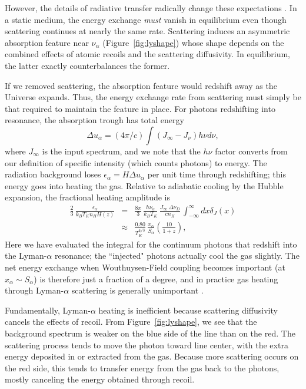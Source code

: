 \documentclass[a4paper,openany, 12pt]{book}
\begin{document}
However, the details of radiative transfer radically change these expectations \cite{chen04}.  In a static medium, the energy exchange \emph{must} vanish in equilibrium even though scattering continues at nearly the same rate.
Scattering induces an asymmetric absorption feature near $\nu_\alpha$ (Figure~\ref{fig:lyshape}) whose shape depends on the combined effects of atomic recoils and the scattering diffusivity.  In equilibrium, the latter exactly counterbalances the former.  

If we removed scattering, the absorption feature would redshift away as the Universe expands. Thus, the energy exchange rate from scattering must simply be that required to maintain the feature in place.  For photons redshifting into resonance, the absorption trough has total energy 
\begin{equation}
\Delta u_\alpha = (4\pi/c) \int (J_\infty - J_\nu) h \nu d \nu,
\end{equation}
where $J_\infty$ is the input spectrum, and we note that the $h \nu$ factor converts from our definition of specific intensity (which counts photons) to energy.  The radiation background loses $\epsilon_\alpha = H \Delta u_\alpha$ per
unit time through redshifting; this energy goes into heating the gas.
Relative to adiabatic cooling by the Hubble expansion, the fractional
heating amplitude is
\begin{eqnarray}
\frac{2}{3} \, \frac{\epsilon_\alpha}{k_B T_K n_H H(z) } & = & \frac{8 \pi}{3} \, \frac{h \nu_\alpha}{k_B T_K} \, \frac{J_\infty \, \Delta \nu_D}{c n_H} \, \int_{-\infty}^{\infty} d x \delta_J(x) \label{eq:epsalpha}
\\
& \approx & \frac{0.80}{T_K^{4/3}} \, \frac{x_\alpha}{S_\alpha} \left( \frac{10}{1+z} \right),
\label{eq:lyaheat}
\end{eqnarray}
Here we have evaluated the integral for the continuum photons that
redshift into the Lyman-$\alpha$ resonance; the ``injected" photons
actually cool the gas slightly.  The net energy exchange when
Wouthuysen-Field coupling becomes important (at $x_\alpha \sim
S_\alpha$) is therefore just a fraction of a degree, and in practice gas heating through Lyman-$\alpha$ scattering
is generally unimportant \cite{chen04,furl06-lyheat}.

Fundamentally, Lyman-$\alpha$ heating is inefficient because scattering diffusivity cancels the effects of recoil.  From Figure~\ref{fig:lyshape}, we see that the background spectrum is weaker on the blue side of the line than on the red.  The scattering process tends to move the photon toward line center, with the extra energy deposited in or extracted from the gas.  Because more scattering occurs on the red side, this tends to transfer energy from the gas back to the photons, mostly canceling the energy obtained through recoil.
\end{document}
